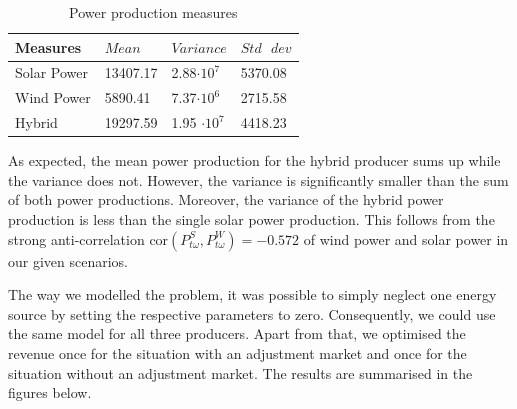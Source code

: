 \begin{table}[h!]
	\centering
	\begin{threeparttable}
		\caption{Power production measures}
		\begin{tabular}{llll}
			\toprule
			Measures & \( Mean \) & \( Variance \) & \( Std \text{ } dev \)  \\
			\midrule
			Solar Power    & 13407.17        &  2.88$\cdot 10^7$      &  5370.08     	    \\
			Wind Power    & 5890.41     &   7.37$\cdot 10^6$      &  2715.58          	\\
			Hybrid    &  19297.59        &  1.95 $\cdot 10^7$    & 4418.23     	\\
			\bottomrule
		\end{tabular}
		
	\end{threeparttable}
\end{table}

As expected, the mean power production for the hybrid producer sums up while the variance does not. However, the variance is significantly smaller than the sum of both power productions. Moreover, the variance of the hybrid power production is less than the single solar power production. This follows from the strong anti-correlation $ \text{cor} (P_{t\omega}^S,P_{t\omega}^W ) = -0.572 $ of wind power and solar power in our given scenarios.  





The way we modelled the problem, it was possible to simply neglect one energy source by setting the respective parameters to zero. Consequently, we could use the same model for all three producers. Apart from that, we optimised the revenue once for the situation with an adjustment market and once for the situation without an adjustment market. The results are summarised in the figures below.  

